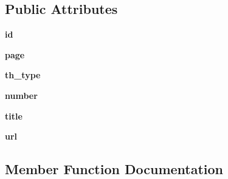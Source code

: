 \subsection*{Public Attributes}
\begin{DoxyCompactItemize}
\item 
\hypertarget{classtexla_1_1PageTree_1_1TheoremsManager_1_1Theorem_ae4801c9a2372be00c472bc293f7bd312}{}\label{classtexla_1_1PageTree_1_1TheoremsManager_1_1Theorem_ae4801c9a2372be00c472bc293f7bd312} 
{\bfseries id}
\item 
\hypertarget{classtexla_1_1PageTree_1_1TheoremsManager_1_1Theorem_a6e0dbaa9c063f72d6d62cc6bbdadb945}{}\label{classtexla_1_1PageTree_1_1TheoremsManager_1_1Theorem_a6e0dbaa9c063f72d6d62cc6bbdadb945} 
{\bfseries page}
\item 
\hypertarget{classtexla_1_1PageTree_1_1TheoremsManager_1_1Theorem_aaf9edaa707fa727934206afd285cfc00}{}\label{classtexla_1_1PageTree_1_1TheoremsManager_1_1Theorem_aaf9edaa707fa727934206afd285cfc00} 
{\bfseries th\+\_\+type}
\item 
\hypertarget{classtexla_1_1PageTree_1_1TheoremsManager_1_1Theorem_ac634737d4833043e63bffea7866451fd}{}\label{classtexla_1_1PageTree_1_1TheoremsManager_1_1Theorem_ac634737d4833043e63bffea7866451fd} 
{\bfseries number}
\item 
\hypertarget{classtexla_1_1PageTree_1_1TheoremsManager_1_1Theorem_ada861276b37b38190fbed67e25145e6c}{}\label{classtexla_1_1PageTree_1_1TheoremsManager_1_1Theorem_ada861276b37b38190fbed67e25145e6c} 
{\bfseries title}
\item 
\hypertarget{classtexla_1_1PageTree_1_1TheoremsManager_1_1Theorem_a33f5654cfd0f472b558378d2ddce0c14}{}\label{classtexla_1_1PageTree_1_1TheoremsManager_1_1Theorem_a33f5654cfd0f472b558378d2ddce0c14} 
{\bfseries url}
\end{DoxyCompactItemize}


\subsection{Member Function Documentation}
\hypertarget{classtexla_1_1PageTree_1_1TheoremsManager_1_1Theorem_a95c04605568b92d092b5c30b1538e318}{}\label{classtexla_1_1PageTree_1_1TheoremsManager_1_1Theorem_a95c04605568b92d092b5c30b1538e318} 
